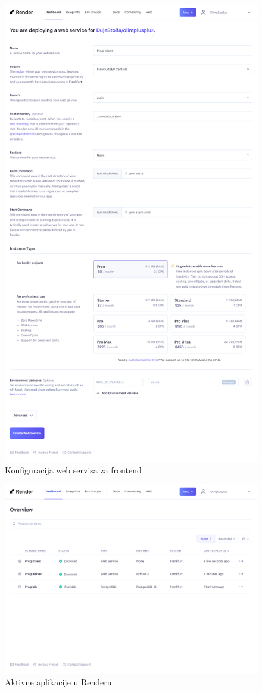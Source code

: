         \begin{figure}[htp]
			\includegraphics[scale=0.14]{slike/deploy_10.png}
			\centering
			\caption{Konfiguracija web servisa za frontend}
            \label{fig:dep-10}
		\end{figure}

        \begin{figure}[htp]
			\includegraphics[scale=0.17]{slike/deploy_11.png}
			\centering
			\caption{Aktivne aplikacije u Renderu}
            \label{fig:dep-11}
		\end{figure}
			
			\eject 
